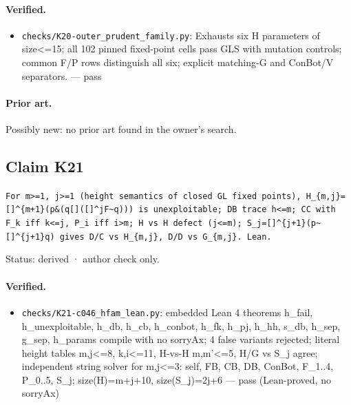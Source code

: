 \documentclass{article}
\begin{document}
\paragraph{Verified.}
\begin{itemize}
\item \texttt{checks/K20-outer\_prudent\_family.py}: Exhausts six H parameters of size\textless{}=15; all 102 pinned fixed-point cells pass GLS with mutation controls; common F/P rows distinguish all six; explicit matching-G and ConBot/V separators. --- pass
\end{itemize}

\paragraph{Prior art.} Possibly new: no prior art found in the owner's search.

\subsection*{Claim K21}

\texttt{For m\textgreater{}=1, j\textgreater{}=1 (height semantics of closed GL fixed points), H\_\{m,j\}=[]\textasciicircum{}\{m+1\}(p\&(q\textbar{}[]([]\textasciicircum{}jF\textbar{}\textasciitilde{}q))) is unexploitable; DB trace h\textless{}=m; CC with F\_k iff k\textless{}=j, P\_i iff i\textgreater{}m; H vs H defect (j\textless{}=m); S\_j=[]\textasciicircum{}\{j+1\}(p\textbar{}\textasciitilde{}[]\textasciicircum{}\{j+1\}q) gives D/C vs H\_\{m,j\}, D/D vs G\_\{m,j\}. Lean.}

Status: derived · author check only.

\paragraph{Verified.}
\begin{itemize}
\item \texttt{checks/K21-c046\_hfam\_lean.py}: embedded Lean 4 theorems h\_fail, h\_unexploitable, h\_db, h\_cb, h\_conbot, h\_fk, h\_pj, h\_hh, s\_db, h\_sep, g\_sep, h\_params compile with no sorryAx; 4 false variants rejected; literal height tables m,j\textless{}=8, k,i\textless{}=11, H-vs-H m,m'\textless{}=5, H/G vs S\_j agree; independent string solver for m,j\textless{}=3: self, FB, CB, DB, ConBot, F\_1..4, P\_0..5, S\_j; size(H)=m+j+10, size(S\_j)=2j+6 --- pass (Lean-proved, no sorryAx)
\end{itemize}
\end{document}
